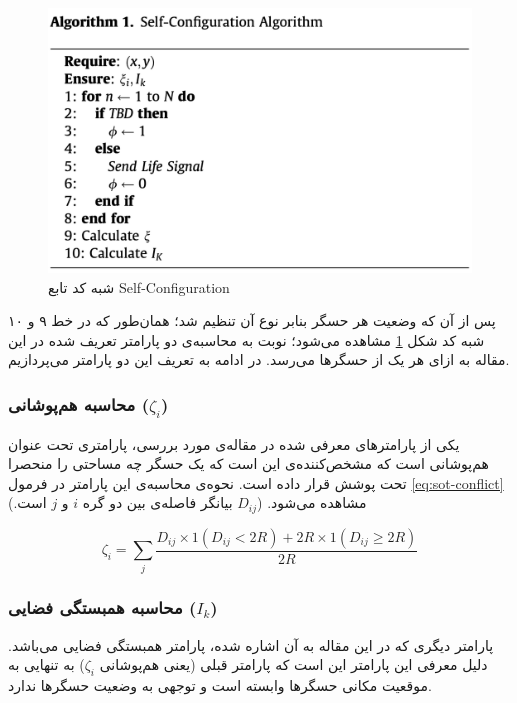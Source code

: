 \begin{figure}
	\centering
	\includegraphics[width=0.7\linewidth]{figs/sot-al1}
	\caption {شبه کد تابع Self-Configuration}
	\label{fig:sot-al1}
\end{figure}

\par
پس از آن که وضعیت هر حسگر بنابر نوع آن تنظیم شد؛ همان‌طور که در خط ۹ و ۱۰ شبه کد شکل \ref{fig:sot-al1} مشاهده می‌شود؛ نوبت به محاسبه‌ی دو پارامتر تعریف شده در این مقاله به ازای هر یک از حسگر‌ها می‌رسد. در ادامه به تعریف این دو پارامتر می‌پردازیم.

\subsubsection{
محاسبه هم‌پوشانی ($\zeta_i$)
}
یکی از پارامترهای معرفی شده در مقاله‌ی مورد بررسی، پارامتری تحت عنوان هم‌پوشانی است که مشخص‌کننده‌ی این است که یک حسگر چه مساحتی را منحصرا تحت پوشش قرار داده است. نحوه‌ی محاسبه‌ی این پارامتر در فرمول \ref{eq:sot-conflict} مشاهده می‌شود. ($D_{ij}$ بیانگر فاصله‌ی بین دو گره $i$ و $j$ است.)

\begin{equation}
\zeta_i = \sum_j \frac{D_{ij} \times 1(D_{ij} < 2R) + 2R \times 1(D_{ij} \geq 2R)}{2R}
\label{eq:sot-conflict}
\end{equation}

\subsubsection{
محاسبه همبستگی فضایی ($I_k$)
}
پارامتر دیگری که در این مقاله به آن اشاره شده، پارامتر همبستگی فضایی می‌باشد. دلیل معرفی این پارامتر این است که پارامتر قبلی (یعنی هم‌پوشانی $\zeta_i$) به تنهایی به موقعیت مکانی حسگرها وابسته است و توجهی به وضعیت حسگرها ندارد. 



















